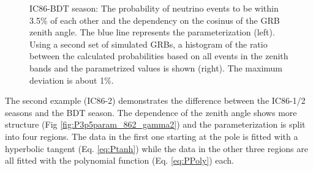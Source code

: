 \begin{figure}[h]
\centering
 \captionsetup{width=.9\textwidth}
\caption{IC86-BDT season: The probability of neutrino events to be within 3.5\% 
of each other and the dependency on the cosinus of the GRB zenith angle. The 
blue line represents the parameterization (left). Using a second set of 
simulated GRBs, a histogram 
of the ratio between the calculated probabilities based on all events in 
the zenith bands and the parametrized values is shown (right). The maximum 
deviation 
is about 1\%.}
\end{figure}

The second example (IC86-2) demonstrates the difference between the IC86-1/2 
seasons 
and the BDT season. The dependence of the zenith angle shows more structure 
(Fig \ref{fig:P3p5param_862_gamma2}) and the parameterization is split into 
four regions. The data in the first one starting at the pole is fitted with a
hyperbolic tangent (Eq. \ref{eq:Ptanh}) while the data in the other three 
regions are all fitted with the polynomial function (Eq. \ref{eq:PPoly}) each.

